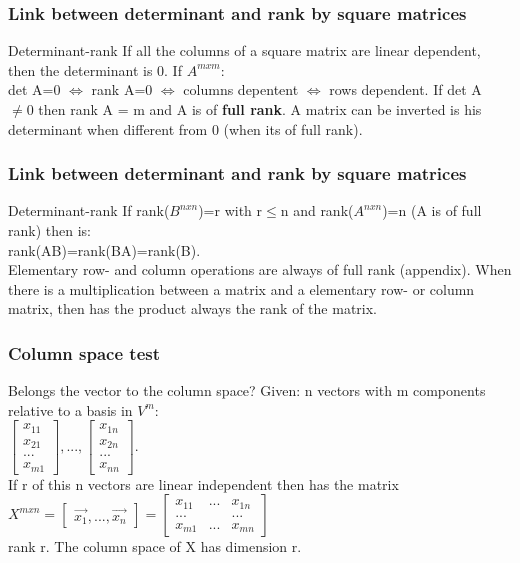 \begin{frame}
	\frametitle{Link between determinant and rank by square matrices}
	\begin{block}{Determinant-rank}
		If all the columns of a square matrix are linear dependent, then the determinant is 0. If $A^{mxm}$: \\
		det A=0 $\Leftrightarrow$ rank A=0 $\Leftrightarrow$ columns depentent $\Leftrightarrow$ rows dependent.
		If det A $\neq 0$ then rank A = m and A is of {\bf full rank}. A matrix can be inverted is his determinant when different from 0 (when its of full rank).
	\end{block}
\end{frame}

\begin{frame}
	\frametitle{Link between determinant and rank by square matrices}
	\begin{block}{Determinant-rank}
		If rank($B^{nxn}$)=r with r$\leq$n and rank($A^{nxn}$)=n (A is of full rank) then is:\\
		rank(AB)=rank(BA)=rank(B).\\
		Elementary row- and column operations are always of full rank (appendix). When there is a multiplication between a matrix and a elementary row- or column matrix, then has the product always the rank of the matrix.
	\end{block}
\end{frame}

\begin{frame}
	\frametitle{Column space test}
	\begin{block}{Belongs the vector to the column space?}
		Given: n vectors with m components relative to a basis in $V^m$:\\
		$\begin{bmatrix} x_{11}\\x_{21}\\...\\x_{m1} \end{bmatrix},...,\begin{bmatrix} x_{1n}\\x_{2n}\\...\\x_{nn}\end{bmatrix}$.\\
		If r of this n vectors are linear independent then has the matrix \\
		$X^{mxn}=\begin{bmatrix} \overrightarrow{x_1},...,\overrightarrow{x_n}\end{bmatrix}=\begin{bmatrix} x_{11} & ... & x_{1n}\\ ... & & ...\\ x_{m1} & ... & x_{mn}\end{bmatrix}$\\
		rank r. The column space of X has dimension r.
	\end{block}
\end{frame}

